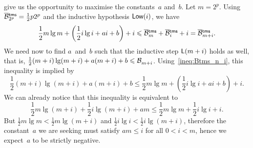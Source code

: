 give us the opportunity to maximise the constants~\(a\)
and~\(b\). Let \(m=2^p\). Using
\(\OB{\fun{tms}}{2^p} = \tfrac{1}{2}p2^p\) and the inductive
hypothesis \(\textsf{Low}({i})\), we have
\begin{equation}
\frac{1}{2}m\lg m + \left(\frac{1}{2}i\lg i + ai + b\right) + i
\leqslant
\OB{\fun{tms}}{m} + \OB{\fun{tms}}{i} + i = \OB{\fun{tms}}{m+i}.
\label{ineq:Btms_n_i}
\end{equation}
We need now to find \(a\)~and~\(b\) such that the inductive step
\(\textsf{L}({m+i})\) holds as well, that is,
\(\tfrac{1}{2}(m+i)\lg(m+i) + a(m+i) + b \leqslant \mathcal{B}_{m+i}^{}\).
Using~\eqref{ineq:Btms_n_i}, this inequality is implied by
\begin{equation*}
\frac{1}{2}(m+i)\lg(m+i) + a(m+i) + b
\leqslant
\frac{1}{2}m\lg m + \left(\frac{1}{2}i\lg i + ai + b\right) + i.
\end{equation*}
We can already notice that this inequality is equivalent to
\begin{equation}
\frac{1}{2}m\lg(m+i) + \frac{1}{2}i\lg(m+i) + am
\leqslant \frac{1}{2}m\lg m + \frac{1}{2}i\lg i + i.
\label{ineq:Btms_n_i_details}
\end{equation}
But \(\tfrac{1}{2}m\lg m < \tfrac{1}{2}m\lg(m+i)\) and
\(\tfrac{1}{2}i\lg i < \tfrac{1}{2}i\lg(m+i)\), therefore the
constant~\(a\) we are seeking must satisfy \(am \leqslant i\) for all
\(0 < i < m\), hence we expect~\(a\) to be strictly negative.

